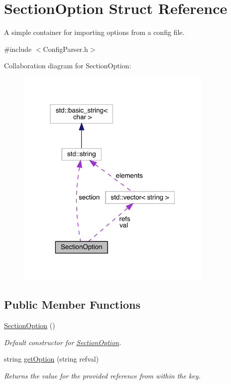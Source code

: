 \hypertarget{struct_section_option}{}\section{Section\+Option Struct Reference}
\label{struct_section_option}


A simple container for importing options from a config file.  




{\ttfamily \#include $<$Config\+Parser.\+h$>$}



Collaboration diagram for Section\+Option\+:
\nopagebreak
\begin{figure}[H]
\begin{center}
\leavevmode
\includegraphics[width=267pt]{struct_section_option__coll__graph}
\end{center}
\end{figure}
\subsection*{Public Member Functions}
\begin{DoxyCompactItemize}
\item 
\hyperlink{struct_section_option_a0a6a33e41311ea0eef34b76379421362}{Section\+Option} ()\hypertarget{struct_section_option_a0a6a33e41311ea0eef34b76379421362}{}\label{struct_section_option_a0a6a33e41311ea0eef34b76379421362}

\begin{DoxyCompactList}\small\item\em Default constructor for \hyperlink{struct_section_option}{Section\+Option}. \end{DoxyCompactList}\item 
string \hyperlink{struct_section_option_a78d55aa842ba2056764236246492734f}{get\+Option} (string refval)
\begin{DoxyCompactList}\small\item\em Returns the value for the provided reference from within the key. \end{DoxyCompactList}\end{DoxyCompactItemize}
